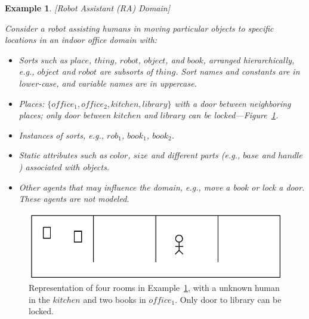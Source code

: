 \documentclass[letterpaper, 10 pt, conference]{article}  %
\newtheorem{example2}{\bf Example}
\begin{document}
\begin{example2}\label{ex:illus-example}[Robot Assistant (RA) Domain]
  {\rm Consider a robot assisting humans in moving particular objects
    to specific locations in an indoor office domain with:
    \begin{itemize}
    \item Sorts such as $place$, $thing$, $robot$, $object$, and
      $book$, arranged hierarchically, e.g., $object$ and $robot$ are
      subsorts of $thing$. Sort names and constants are in lower-case,
      and variable names are in uppercase.
    \item Places: $\{office_1, office_2, kitchen, library\}$ with a
      door between neighboring places; only door between $kitchen$ and
      $library$ can be locked---Figure~\ref{fig:places}.
    \item Instances of sorts, e.g., $rob_1$, $book_1$, $book_2$.
    \item Static attributes such as $color$, $size$ and different
      parts (e.g., $base$ and $handle$) associated with objects.
    \item Other agents that may influence the domain, e.g., move a
      book or lock a door. These agents are not modeled.
    \end{itemize}
  }
\end{example2}

\begin{figure}[tbh]
  \centering
  \includegraphics[width=0.95\columnwidth]{Images/fourrooms.pdf}
  \caption{Representation of four rooms in Example~\ref{fig:places},
    with a unknown human in the $kitchen$ and two books in $office_1$.
    Only door to library can be locked.}
  \label{fig:places}
\end{figure}

\end{document}
